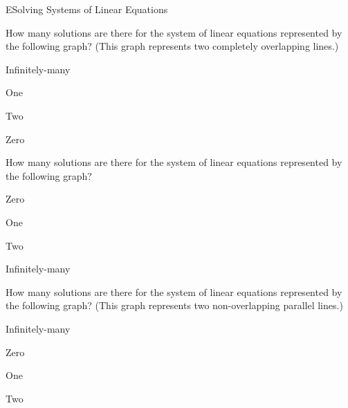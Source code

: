 \documentclass{article}[12pt]
\begin{document}
\begin{module}{E}{Solving Systems of Linear Equations}
\begin{readinessAssuranceTest}
\item How many solutions are there for the system of linear equations
      represented by the following graph? (This graph represents two completely
      overlapping lines.)
    \begin{center}
      \systemWithInfinitelyManySolutions
    \end{center}

\begin{multicols}{4}
\begin{readinessAssuranceTestChoices}
\item Infinitely-many %
\item One
\item Two
\item Zero
\end{readinessAssuranceTestChoices}
\end{multicols}


\item How many solutions are there for the system of linear equations
      represented by the following graph?
    \begin{center}
      \systemWithOneSolutionA
    \end{center}

\begin{multicols}{4}
\begin{readinessAssuranceTestChoices}
\item Zero
\item One %
\item Two
\item Infinitely-many
\end{readinessAssuranceTestChoices}
\end{multicols}


\item How many solutions are there for the system of linear equations
      represented by the following graph? (This graph represents two
      non-overlapping parallel lines.)
    \begin{center}
      \systemWithNoSolutions
    \end{center}

\begin{multicols}{4}
\begin{readinessAssuranceTestChoices}
\item Infinitely-many
\item Zero %
\item One
\item Two
\end{readinessAssuranceTestChoices}
\end{multicols}



\end{readinessAssuranceTest}
\end{module}
\end{document}
